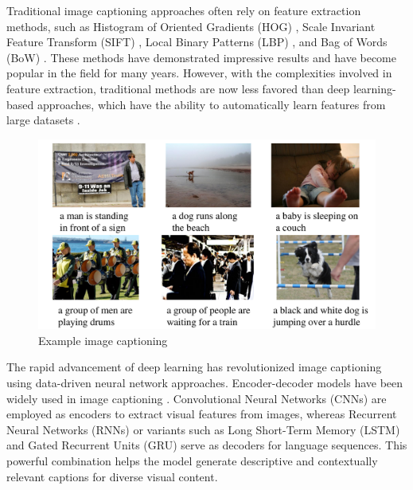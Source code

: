 \documentclass[conference]{IEEEtran}
\begin{document}
Traditional image captioning approaches often rely on feature extraction methods, such as Histogram of Oriented Gradients (HOG) \cite{tomasi2012histograms}, Scale Invariant Feature Transform (SIFT) \cite{david2004distinctive}, Local Binary Patterns (LBP) \cite{ojala2000gray}, and Bag of Words (BoW) \cite{tsai2012bag}. These methods have demonstrated impressive results and have become popular in the field for many years. However, with the complexities involved in feature extraction, traditional methods are now less favored than deep learning-based approaches, which have the ability to automatically learn features from large datasets \cite{pouyanfar2018survey}.

\begin{figure}[t]
\includegraphics[width=\columnwidth]{assets/example_image_captioning.pdf}
  \caption{Example image captioning}
  \label{fig:example}
\end{figure}


The rapid advancement of deep learning \cite{krizhevsky2017imagenet, bengio2013representation, lecun2015deep} has revolutionized image captioning using data-driven neural network approaches. %
Encoder-decoder models have been widely used in image captioning \cite{xiao2019deep}. Convolutional Neural Networks (CNNs) \cite{kim2014convolutional, lecun1995convolutional, Atliha2020, krizhevsky2012imagenet} are employed as encoders to extract visual features from images, whereas Recurrent Neural Networks (RNNs) \cite{pascanu2013construct} or variants such as Long Short-Term Memory (LSTM) \cite{karpathy2015visualizing} and Gated Recurrent Units (GRU) \cite{do2020reference} serve as decoders for language sequences. This powerful combination helps the model generate descriptive and contextually relevant captions for diverse visual content.
\end{document}
